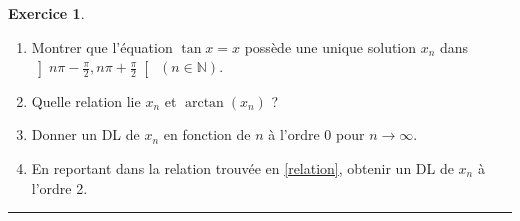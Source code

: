 \documentclass[a4paper,10pt]{article}
\theoremstyle{definition}
\theoremstyle{definition}
\newtheorem{exo}{Exercice}
\newcommand{\N}{\mathbb{N}}
\begin{document}
\begin{minipage}{1\linewidth}
\begin{minipage}[t]{0.48\linewidth}
\begin{exo}\quad\\
\begin{enumerate}
  \item  Montrer que l'équation $\tan x = x$ possède une unique solution
   $x_n$ dans
   $\left]n\pi-\frac \pi 2, n\pi+\frac \pi 2\right[$ $(n\in \N)$.
  \item  Quelle relation lie $x_n$ et $\arctan(x_n)$ ? \label{relation}
  \item  Donner un DL de $x_n$ en fonction de $n$ à l'ordre $0$ pour $n\to\infty$.
  \item  En reportant dans la relation trouvée en \ref{relation},
     obtenir un DL de $x_n$ à l'ordre 2.
\end{enumerate}
\centering\rule{1\linewidth}{0.6pt}
\end{exo}






\end{minipage}
\end{minipage}
\end{document}
